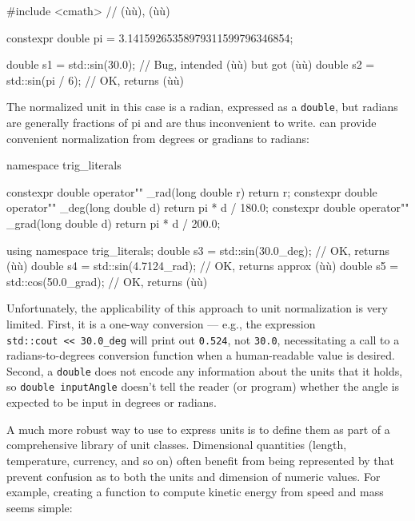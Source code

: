 \begin{emcppslisting}[emcppsbatch=e19]
#include <cmath>  // (ù{}ù), (ù{}ù)

constexpr double pi = 3.14159265358979311599796346854;

double s1 = std::sin(30.0);    // Bug, intended (ù{}ù) but got (ù{}ù)
double s2 = std::sin(pi / 6);  // OK, returns (ù{}ù)
\end{emcppslisting}
    
\noindent The normalized unit in this case is a radian, expressed as a
\lstinline!double!, but radians are generally fractions of pi and are thus
inconvenient to write.  can provide convenient
normalization from degrees or gradians to radians:

\begin{emcppslisting}[emcppsbatch=e19]
namespace trig_literals {

constexpr double operator"" _rad(long double r)  { return r; }
constexpr double operator"" _deg(long double d)  { return pi * d / 180.0; }
constexpr double operator"" _grad(long double d) { return pi * d / 200.0; }

}

using namespace trig_literals;
double s3 = std::sin(30.0_deg);     // OK, returns (ù{}ù)
double s4 = std::sin(4.7124_rad);   // OK, returns approx (ù{}ù)
double s5 = std::cos(50.0_grad);    // OK, returns (ù{}ù)
\end{emcppslisting}
    
\noindent Unfortunately, the applicability of this approach to unit normalization
is very limited. First, it is a one-way conversion --- e.g., the
expression \lstinline!std::cout!~\lstinline!<<!~\lstinline!30.0_deg! will print
out \lstinline!0.524!, not \lstinline!30.0!, necessitating a call to a
radians-to-degrees conversion function when a human-readable value is
desired. Second, a \lstinline!double! does not encode any information about
the units that it holds, so \lstinline!double!~\lstinline!inputAngle! doesn't
tell the reader (or program) whether the angle is expected to be input
in degrees or radians.

A much more robust way to use  to express units is to
define them as part of a comprehensive library of unit classes.
Dimensional quantities (length, temperature, currency, and so on) often
benefit from being represented by  that
prevent confusion as to both the units and dimension of numeric values.
For example, creating a function to compute kinetic energy from speed
and mass seems simple:

